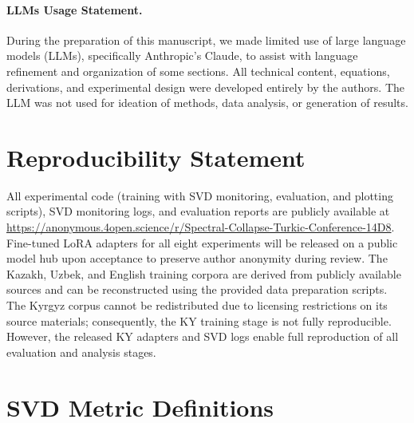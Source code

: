 \documentclass[11pt]{article}
\begin{document}
\paragraph{LLMs Usage Statement.} During the preparation of this manuscript, we made limited use of large language models (LLMs), specifically Anthropic's Claude, to assist with language refinement and organization of some sections. All technical content, equations, derivations, and experimental design were developed entirely by the authors. The LLM was not used for ideation of methods, data analysis, or generation of results.

\section*{Reproducibility Statement}

All experimental code (training with SVD monitoring, evaluation, and plotting scripts), SVD monitoring logs, and evaluation reports are publicly available at \url{https://anonymous.4open.science/r/Spectral-Collapse-Turkic-Conference-14D8}. Fine-tuned LoRA adapters for all eight experiments will be released on a public model hub upon acceptance to preserve author anonymity during review. The Kazakh, Uzbek, and English training corpora are derived from publicly available sources and can be reconstructed using the provided data preparation scripts. The Kyrgyz corpus cannot be redistributed due to licensing restrictions on its source materials; consequently, the KY training stage is not fully reproducible. However, the released KY adapters and SVD logs enable full reproduction of all evaluation and analysis stages.



\appendix


\section{SVD Metric Definitions}
\label{app:metrics}
\end{document}

